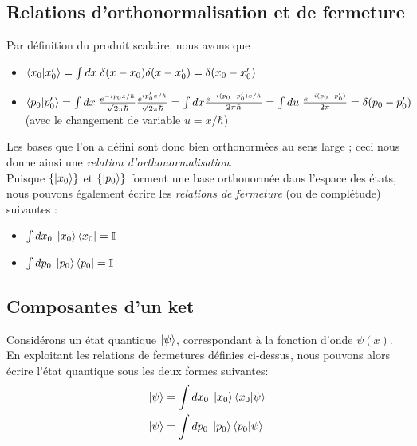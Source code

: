 \documentclass{article}
\begin{document}
\subsection*{Relations d'orthonormalisation et de fermeture}

Par définition du produit scalaire, nous avons que 
\begin{itemize}[label=\textbullet]
    \item $\braket{x_0|x_0'} = \int dx \; \delta (x-x_0) \delta (x-x_0') = \delta (x_0 - x_0')$
    \item $\braket{p_0|p_0'} = \int dx \; \frac{e^{-ip_0 x/\hbar}}{\sqrt{2\pi\hbar}} \frac{e^{ip_0'x/\hbar}}{\sqrt{2\pi\hbar}} = \int dx \frac{e^{-i (p_0 - p_0')x/\hbar}}{2\pi \hbar}	= \int du \; \frac{e^{-i(p_0 - p_0')}}{2\pi} = \delta (p_0-p_0')$ (avec le changement de variable $u = x/\hbar$) \\
\end{itemize}

Les bases que l'on a défini sont donc bien orthonormées au sens large ; ceci nous donne ainsi une \textit{relation d'orthonormalisation}. \\

Puisque $\left\{ \ket{x_0} \right\}$ et $\left\{ \ket{p_0} \right\}$ forment une base orthonormée dans l'espace des états, nous pouvons également écrire les \textit{relations de fermeture} (ou de complétude) suivantes : 
\begin{itemize}[label=\textbullet]
    \item $\int dx_0 \; \ket{x_0}\bra{x_0} = \mathbb{I}$ 
    \item $\int dp_0 \; \ket{p_0}\bra{p_0} = \mathbb{I}$ 
\end{itemize}

\subsection*{Composantes d'un ket}

Considérons un état quantique $\ket{\psi}$, correspondant à la fonction d'onde $\psi(x)$. En exploitant les relations de fermetures définies ci-dessus, nous pouvons alors écrire l'état quantique sous les deux formes suivantes:
\begin{align}
\ket{\psi} &= \int dx_0 \; \ket{x_0} \braket{x_0|\psi} \\
\ket{\psi} &= \int dp_0 \; \ket{p_0} \braket{p_0|\psi}
\end{align}
\end{document}
